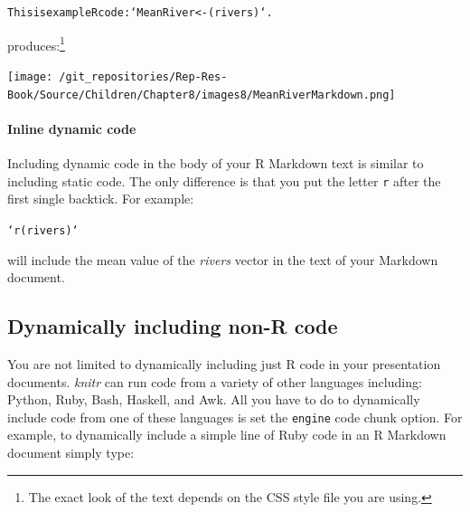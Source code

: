 {\begin{knitrout}
\color{fgcolor}\begin{kframe}
\begin{alltt}
This is example R code: `MeanRiver <- (rivers)`.
\end{alltt}
\end{kframe}
\end{knitrout}


\noindent produces:\footnote{The exact look of the text depends on the CSS style file you are using.}

\texttt{[image: /git\_repositories/Rep-Res-Book/Source/Children/Chapter8/images8/MeanRiverMarkdown.png]}

\paragraph{Inline dynamic code}

Including dynamic code in the body of your R Markdown text is similar to including static code. The only difference is that you put the letter \texttt{r} after the first single backtick. For example:

\begin{knitrout}
\color{fgcolor}\begin{kframe}
\begin{alltt}
`r (rivers)`
\end{alltt}
\end{kframe}
\end{knitrout}


\noindent will include the mean value of the {\emph{rivers}} vector in the text of your Markdown document.

\subsection{Dynamically including non-R code}

You are not limited to dynamically including just R code in your presentation documents. {\emph{knitr}} can run code from a variety of other languages including: Python, Ruby, Bash, Haskell, and Awk. All you have to do to dynamically include code from one of these languages is set the \texttt{engine} code chunk option. For example, to dynamically include a simple line of Ruby code in an R Markdown document simply type:

}
